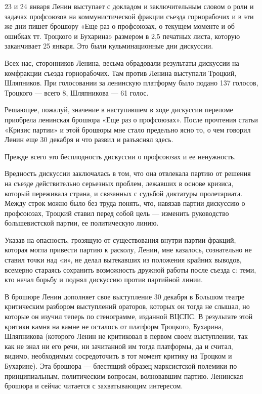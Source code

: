 \documentclass[12pt, a4paper, openany]{book}
\begin{document}
23 и 24 января Ленин выступает с докладом и заключительным словом о роли и задачах профсоюзов на коммунистической фракции съезда горнорабочих и в эти же дни пишет брошюру «Еще раз о профсоюзах, о текущем моменте и об ошибках тт. Троцкого и Бухарина» размером в 2,5 печатных листа, которую заканчивает 25 января. Это были кульминационные дни дискуссии.

Всех нас, сторонников Ленина, весьма обрадовали результаты дискуссии на комфракции съезда горнорабочих. Там против Ленина выступали Троцкий, Шляпников. При голосовании за ленинскую платформу было подано 137 голосов, Троцкого — всего 8, Шляпникова — 61 голос.

Решающее, пожалуй, значение в наступившем в ходе дискуссии переломе приобрела ленинская брошюра «Еще раз о профсоюзах». После прочтения статьи «Кризис партии» и этой брошюры мне стало предельно ясно то, о чем говорил Ленин еще 30 декабря и что развил и разъяснял здесь.

Прежде всего это бесплодность дискуссии о профсоюзах и ее ненужность.

Вредность дискуссии заключалась в том, что она отвлекала партию от решения на съезде действительно серьезных проблем, лежавших в основе кризиса, который переживала страна, и связанных с судьбой диктатуры пролетариата. Между строк можно было без труда понять, что, навязав партии дискуссию о профсоюзах, Троцкий ставил перед собой цель — изменить руководство большевистской партии, ее политическую линию.

Указав на опасность, грозящую от существования внутри партии фракций, которая могла привести партию к расколу, Ленин, мне казалось, сознательно не ставил точки над «и», не делал вытекавших из положения крайних выводов, всемерно стараясь сохранить возможность дружной работы после съезда с: теми, кто начал борьбу и поднял дискуссию против партийной линии.

В брошюре Ленин дополняет свое выступление 30 декабря в Большом театре критическим разбором выступлений ораторов, которых он тогда не слышал, но которые он изучил теперь по стенограмме, изданной ВЦСПС. В результате этой критики камня на камне не осталось от платформ Троцкого, Бухарина, Шляпникова (которого Ленин не критиковал в первом своем выступлении, так как не знал ни его речи, ни зачитанной им тогда платформы, да и считал, видимо, необходимым сосредоточить в тот момент критику на Троцком и Бухарине). Эта брошюра — блестящий образец марксистской полемики по принципиальным, политическим вопросам, волновавшим партию. Ленинская брошюра и сейчас читается с захватывающим интересом.
\end{document}
